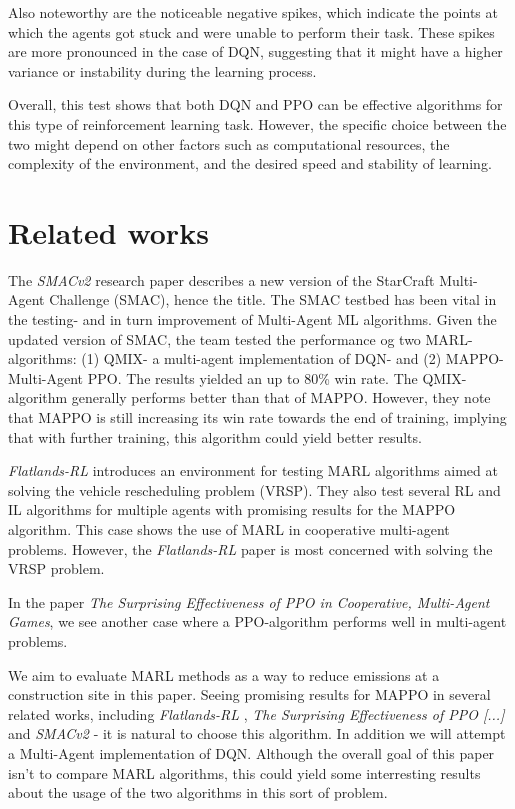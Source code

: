 \documentclass[conference]{IEEEtran}
\begin{document}
	Also noteworthy are the noticeable negative spikes, which indicate the points at which the agents got
	stuck and were unable to perform their task. These spikes are more pronounced in the case of DQN,
	suggesting that it might have a higher variance or instability during the learning process.

	Overall, this test shows that both DQN and PPO can be effective algorithms for this type of reinforcement
	learning task. However, the specific choice between the two might depend on other factors such as
	computational resources, the complexity of the environment, and the desired speed and stability of
	learning.




	\section{Related works}
	The \textit{SMACv2} \cite{ellis2022smacv2} research paper describes a new version of the StarCraft Multi-Agent
	Challenge (SMAC), hence the title. The SMAC testbed has been vital in the testing- and in turn improvement
	of Multi-Agent ML algorithms. Given the updated version of SMAC, the team tested the performance og two
	MARL- algorithms: (1) QMIX- a multi-agent implementation of DQN- and (2) MAPPO- Multi-Agent PPO. The
	results yielded an up to 80\% win rate. The QMIX-algorithm generally performs better than that of MAPPO.
	However, they note that MAPPO is still increasing its win rate towards the end of training, implying
	that with further training, this algorithm could yield better results.

	\textit{Flatlands-RL} \cite{laurent2021flatland} introduces an environment for testing MARL algorithms aimed at
	solving the vehicle rescheduling problem (VRSP). They also test several RL and IL algorithms for
	multiple agents with promising results for the MAPPO algorithm. This case shows the use of MARL in cooperative
	multi-agent problems. However, the \textit{Flatlands-RL} paper is most concerned with solving the VRSP problem.

	In the paper \textit{The Surprising Effectiveness of PPO in Cooperative, Multi-Agent Games}, \cite{yu2022surprising}
	we see another case where a PPO-algorithm performs well in multi-agent problems.

	We aim to evaluate MARL methods as a way to reduce \coo{} emissions at a construction site in this paper.
	Seeing promising results for MAPPO in several related works, including \textit{Flatlands-RL} \cite{laurent2021flatland},
	\textit{The Surprising Effectiveness of PPO [...]} \cite{yu2022surprising} and \textit{SMACv2} \cite{ellis2022smacv2}-
	it is natural to choose this algorithm. In addition we will attempt a Multi-Agent implementation of DQN. Although the
	overall goal of this paper isn't to compare MARL algorithms, this could yield some interresting results about the
	usage of the two algorithms in this sort of problem.
\end{document}

